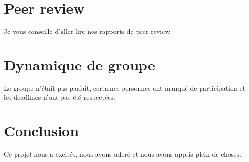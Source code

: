\documentclass{article}
\begin{document}
\section{Peer review}

Je vous conseille d'aller lire nos rapports de peer review.

\section{Dynamique de groupe}

Le groupe n'était pas parfait, certaines personnes ont manqué de participation et les deadlines n'ont pas été respectées.

\section{Conclusion}

Ce projet nous a excités, nous avons adoré et nous avons appris plein de choses.
\end{document}
